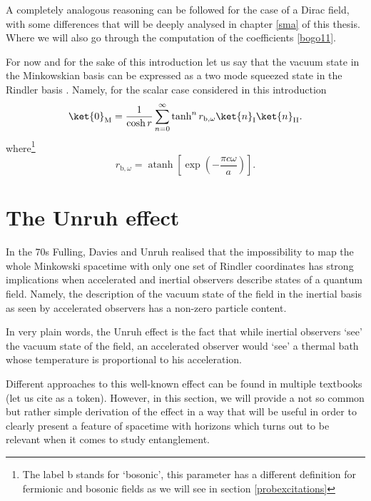 A completely analogous reasoning can be followed for the case of a Dirac field, with some differences that will be deeply analysed in chapter \ref{sma} of this thesis. Where we will also go through the computation of the coefficients \eqref{bogo11}.

For now and for the sake of this introduction let us say that the vacuum state in the Minkowskian basis can be expressed as a two mode squeezed state in the Rindler basis \cite{Takagi, Alicefalls,NavarroSalas}. Namely, for the scalar case considered in this introduction
\begin{equation}\label{scalarvacuum1}
\ket{0}_{\text{M}}=\frac{1}{\cosh r}\sum_{n=0}^\infty \tanh^n r_{\text{b},\omega} \ket{n}_{\text{I}}\ket{n}_{\text{II}}.
\end{equation}
where\footnote{The label b stands for `bosonic', this parameter has a different definition for fermionic and bosonic fields as we will see in section \ref{probexcitations}}
\begin{equation}\label{rbos1}
r_{\text{b},\omega}=\operatorname{atanh} \left[\exp\left(-\frac{\pi c\omega }{a}\right)\right].
\end{equation}

\section{The Unruh effect}\label{tue}

In the 70s Fulling, Davies and Unruh realised that the impossibility to map the whole Minkowski spacetime with only one set of Rindler coordinates has strong implications when accelerated and inertial observers describe states of a quantum field. Namely, the description of the vacuum state of the field in the inertial basis as seen by accelerated observers has a non-zero particle content. 

In very plain words, the Unruh effect is the fact that while inertial observers `see' the vacuum state of the field, an accelerated observer would `see' a thermal bath whose temperature is proportional to his acceleration.

Different approaches to this well-known effect can be found in multiple textbooks (let us cite \cite{Wald2,Birrell,NavarroSalas} as a token). However, in this section, we will provide a not so common but rather simple derivation of the effect in a way that will be useful in order to clearly present a feature of spacetime with horizons which turns out to be relevant when it comes to study entanglement.

